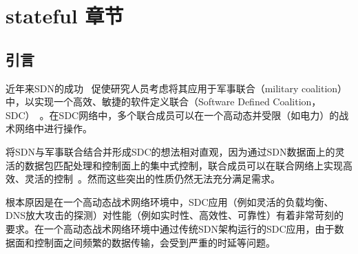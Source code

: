\chapter{stateful 章节}

\section{引言}

近年来SDN的成功~\cite{swan, b4, edgefabric} 促使研究人员考虑将其应用于军事联合（military coalition）中，以实现一个高效、敏捷的软件定义联合（Software Defined Coalition，SDC）~\cite{vinod-sdc}。在SDC网络中，多个联合成员可以在一个高动态并受限（如电力）的战术网络中进行操作。

%

将SDN与军事联合结合并形成SDC的想法相对直观，因为通过SDN数据面上的灵活的数据包匹配处理和控制面上的集中式控制，联合成员可以在联合网络上实现高效、灵活的控制~\cite{P4, rmt}。然而这些突出的性质仍然无法充分满足需求。


根本原因是在一个高动态战术网络环境中，SDC应用（例如灵活的负载均衡、DNS放大攻击的探测）对性能（例如实时性、高效性、可靠性）有着非常苛刻的要求。在一个高动态战术网络环境中通过传统SDN架构运行的SDC应用，由于数据面和控制面之间频繁的数据传输，会受到严重的时延等问题。


